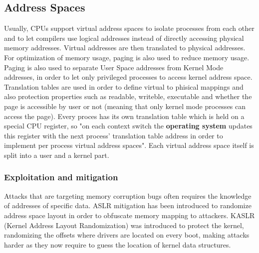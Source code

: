 \subsection{Address Spaces}
Usually, CPUs support virtual address spaces to isolate processes from each other and to let
compilers use logical addresses instead of directly accessing physical memory addresses. Virtual addresses
are then translated to physical addresses. For optimization of memory usage, paging is also used
to reduce memory usage. Paging is also used to separate User Space addresses from Kernel Mode addresses,
in order to let only privileged processes to access kernel address space. Translation tables are used in order to define virtual to phisical mappings
and also protection properties such as readable, writeble, executable and whether the page is accessible by
user or not (meaning that only kernel mode processes can access the page).
Every proces has its own translation table which is held on a special CPU register, so "on each context switch the \textbf{operating system} updates
this register with the next process' translation table address in order to implement per process virtual address spaces".
Each virtual address space itself is split into a user and a kernel part.
\subsubsection{Exploitation and mitigation}
Attacks that are targeting memory corruption bugs often requires the knowledge of addresses of specific data.
ASLR mitigation has been introduced to randomize address space layout in order to obfuscate memory mapping to
attackers. KASLR (Kernel Address Layout Randomization) was introduced to protect the kernel, randomizing the offsets where
drivers are located on every boot, making attacks harder as they now require to guess the location of kernel data structures.

